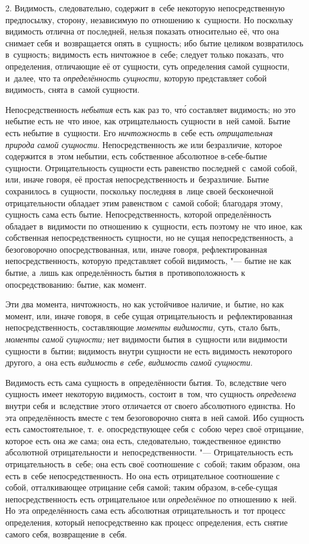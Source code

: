 2. Видимость, следовательно, содержит в~себе некоторую непосредственную
предпосылку, сторону, независимую по отношению к~сущности. Но поскольку
видимость отлична от последней, нельзя показать относительно её, что она
снимает себя и~возвращается опять в~сущность; ибо бытие целиком
возвратилось в~сущность; видимость есть ничтожное в~себе; следует только
показать, что определения, отличающие её от сущности, суть определения
самой сущности, и~далее, что та {\em определённость
сущности,} которую представляет собой видимость, снята в~самой сущности.

Непосредственность {\em небытия} есть как раз то, чт\'{о}
составляет видимость; но это небытие есть не~что иное, как отрицательность
сущности в~ней самой. Бытие есть небытие в~сущности. Его
{\em ничтожность} в~себе есть
{\em отрицательная природа самой сущности}.
Непосредственность же или безразличие, которое содержится в~этом небытии,
есть собственное абсолютное в-себе-бытие сущности. Отрицательность сущности
есть равенство последней с~самой собой, или, иначе говоря, её простая
непосредственность и~безразличие. Бытие сохранилось в~сущности, поскольку
последняя в~лице своей бесконечной отрицательности обладает этим равенством
с~самой собой; благодаря этому, сущность сама есть бытие.
Непосредственность, которой определённость обладает в~видимости по
отношению к~сущности, есть поэтому не~что иное, как собственная
непосредственность сущности, но не сущая непосредственность, а
безоговорочно опосредствованная, или, иначе говоря, рефлектированная
непосредственность, которую представляет собой видимость, "--- бытие не как
бытие, а~лишь как определённость бытия в~противоположность к
опосредствованию: бытие, как момент.

Эти два момента, ничтожность, но как устойчивое наличие, и~бытие, но как
момент, или, иначе говоря, в~себе сущая отрицательность и~рефлектированная
непосредственность, составляющие {\em моменты
видимости,} суть, стало быть, {\em моменты самой
сущности;} нет видимости бытия в~сущности или видимости сущности в~бытии;
видимость внутри сущности не есть видимость некоторого другого, а~она есть
{\em видимость в~себе,}
{\em видимость самой сущности}.

Видимость есть сама сущность в~определённости бытия. То, вследствие чего
сущность имеет некоторую видимость, состоит в~том, что сущность
{\em определена} внутри себя и~вследствие этого
отличается от своего абсолютного единства. Но эта определённость вместе с
тем безоговорочно снята в~ней самой. Ибо сущность есть самостоятельное,
т.~е. опосредствующее себя с~собою через своё отрицание, которое есть она
же сама; она есть, следовательно, тождественное единство абсолютной
отрицательности и~непосредственности. "--- Отрицательность есть
отрицательность в~себе; она есть своё соотношение с~собой; таким образом,
она есть в~себе непосредственность. Но она есть отрицательное соотношение с
собой, отталкивающее отрицание себя самой; таким образом, в-себе-сущая
непосредственность есть отрицательное или
{\em определённое} по отношению к~ней. Но эта
определённость сама есть абсолютная отрицательность и~тот процесс
определения, который непосредственно как процесс определения, есть снятие
самого себя, возвращение в~себя.


